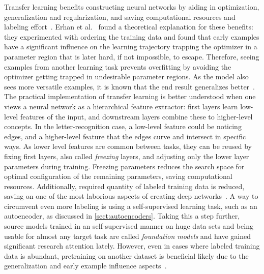 \documentclass[english,twoside,openright]{UH_DS_MSc}
\begin{document}
Transfer learning benefits constructing neural networks 
by aiding in optimization, generalization and regularization, and saving computational resources and labeling effort~\cite{erhanWhyDoesUnsupervised2010, transferlearning_survey}.
Erhan et al.~\cite{erhanWhyDoesUnsupervised2010} found a theoretical explanation for these benefits: they
experimented with ordering the training data and found 
that early examples have a significant influence on the learning trajectory trapping the optimizer in a parameter region that is later hard, 
if not impossible, to escape. Therefore, seeing examples from another learning task prevents overfitting by avoiding the optimizer getting trapped in undesirable parameter regions. As the model also sees more versatile examples, it is known that the end result generalizes better~\cite{transferlearning_survey}.
The practical implementation of transfer learning is better understood when one views a neural network as a hierarchical feature extractor:
first layers learn low-level features of the input, and downstream layers combine these to higher-level concepts.
In the letter-recognition case, a low-level feature could be noticing edges, and a higher-level feature that the edges curve and intersect in 
specific ways. As lower level features are common between tasks, they can be reused by fixing first layers, also called \textit{freezing} layers,
and adjusting only the lower layer parameters during training.
Freezing parameters reduces the search space for optimal configuration of the remaining parameters, saving computational resources. Additionally, required quantity of labeled training data is reduced, saving on one of the most laborious aspects of creating deep networks~\cite{engbook}.
A way to circumvent even more labeling is using a self-supervised learning task, such as an autoencoder, as discussed in \ref{sect:autoencoders}. Taking this a step further, source models trained in an self-supervised manner on huge data sets and being usable for almost any target task are called \textit{foundation models} and have gained significant research attention lately. However, even in cases where labeled training data is abundant, pretraining on another dataset is beneficial likely due to the generalization and early example influence aspects~\cite{erhanWhyDoesUnsupervised2010}.
\end{document}
